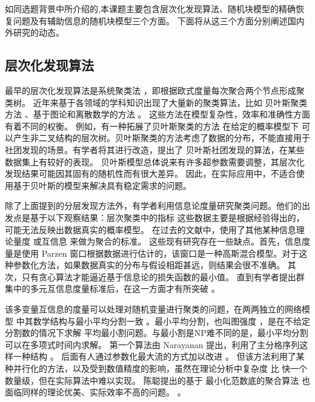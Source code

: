 
如同选题背景中所介绍的,本课题主要包含层次化发现算法、随机块模型的精确恢复问题及有辅助信息的随机块模型三个方面。
下面将从这三个方面分别阐述国内外研究的动态。
\subsection{层次化发现算法}

最早的层次化发现算法是系统聚类法 \cite{slink}，即根据欧式度量每次聚合两个节点形成聚类树。
近年来基于各领域的学科知识出现了大量新的聚类算法，比如
贝叶斯聚类方法 \cite{bhc}、基于图论和离散数学的方法 \cite{dasgupta2016cost}
。
这些方法在模型复杂性，效率和准确性方面有着不同的权衡。
例如，有一种拓展了贝叶斯聚类的方法 \cite{blundell2011discovering}
在给定的概率模型下
可以产生非二叉结构的层次树。贝叶斯聚类的方法考虑了数据的分布，不能直接用于社团发现的场景。有学者将其进行改造，提出了
贝叶斯社团发现的算法\cite{RN23}，在某些数据集上有较好的表现。
贝叶斯模型总体说来有许多超参数需要调整，其层次化发现结果可能因其固有的随机性而有很大差异。 因此，在实际应用中，不适合使用基于贝叶斯的模型来解决具有稳定需求的问题。 

除了上面提到的分层发现方法外，有学者利用信息论度量研究聚类问题。他们的出发点是基于以下观察结果：层次聚类中的指标
这些数据主要是根据经验得出的，可能无法反映出数据真实的概率模型。
在过去的文献中，使用了其他某种信息理论量度 \cite{ic2002} 或互信息\cite{mim}
来做为聚合的标准。
这些现有研究存在一些缺点。首先，信息度量是使用 Parzen 窗口根据数据进行估计的，该窗口是一种高斯混合模型。对于这种参数化方法，如果数据真实的分布与假设相距甚远，则结果会很不准确。
其次，只有贪心算法才能逼近基于信息论的损失函数的最小值。 
直到有学者提出群集中的多元互信息度量标准后，在这一方面才有所突破 \cite{ic2016}。 

该多变量互信息的度量可以处理对随机变量进行聚类的问题，在两两独立的网络模型 \cite{pin}
中其数学结构与最小平均分割一致  \cite{mac}。最小平均分割，也叫图强度 \cite{cunningham1985optimal}，是在不给定分割数的情况下求解
平均最小割问题。与最小割是NP难不同的是，最小平均分割可以在多项式时间内求解。
第一个算法由 Narayanan 提出，利用了主分格序列这样一种结构 \cite{narayanan}。
后面有人通过参数化最大流的方式加以改进 \cite{pic}。
但该方法利用了某种并行化的方法，以及受到数值精度的影响，虽然在理论分析中复杂度
比 \cite{narayanan} 快一个数量级，但在实际算法中难以实现。
陈聪提出的基于 最小化范数底的聚合算法 也面临同样的理论优美、实际效率不高的问题。 \cite{chan2020agglomerative}。

